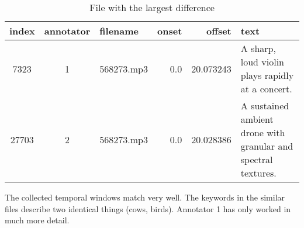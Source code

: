 \begin{table}[h]
  \caption{File with the largest difference}
  \label{tab:largest difference}
  \centering
  \begin{tabular}{cclrrp{6cm}}
    \toprule
    index & annotator & filename & onset & offset & text \\
    \midrule
    7323 & 1 & 568273.mp3 & 0.0 & 20.073243 & A sharp, loud violin plays rapidly at a concert. \\
    27703 & 2 & 568273.mp3 & 0.0 & 20.028386 & A sustained ambient drone with granular and spectral textures. \\
    \bottomrule
  \end{tabular}
\end{table}

The collected temporal windows match very well. The keywords in the similar files describe two identical things (cows, birds).
Annotator 1 has only worked in much more detail.

